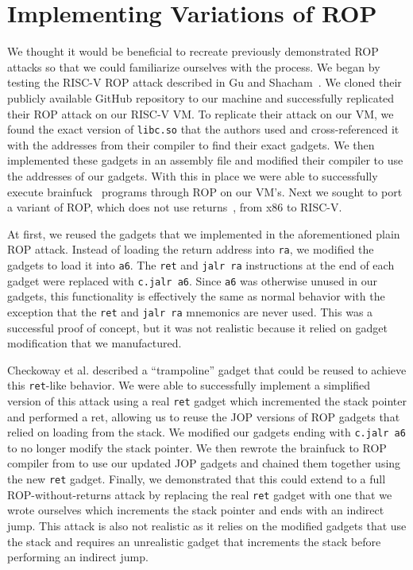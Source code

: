 \section{Implementing Variations of ROP}

We thought it would be beneficial to recreate previously demonstrated ROP attacks
so that we could familiarize ourselves with the process. We began by testing the
RISC-V ROP attack described in Gu and Shacham~\cite{gu20ropriscv}. We cloned
their publicly available GitHub repository to our machine and successfully
replicated their ROP attack on our RISC-V VM. To replicate their attack on our VM, we
found the exact version of \verb|libc.so| that the authors used and cross-referenced
it with the addresses from their compiler to find their exact gadgets. We then
implemented these gadgets in an assembly file and modified their compiler to use
the addresses of our gadgets. With this in place we were able to successfully execute
brainfuck~\cite{gu20ropriscv,brainfuck} programs through ROP on our VM's. Next we sought to port a variant of
ROP, which does not use returns~\cite{checkoway10ropnoret}, from x86 to RISC-V.

At first, we reused the gadgets that we implemented in the aforementioned plain ROP
attack. Instead of loading the return address into \verb|ra|, we modified the
gadgets to load it into \verb|a6|. The \verb|ret| and \verb|jalr ra|
instructions at the end of each gadget were replaced with \verb|c.jalr a6|.
Since \verb|a6| was otherwise unused in our gadgets, this functionality is
effectively the same as normal behavior with the exception that the \verb|ret|
and \verb|jalr ra| mnemonics are never used. This was a successful proof of
concept, but it was not realistic because it relied on gadget modification that
we manufactured.

Checkoway et al. described a ``trampoline'' gadget that could be reused to
achieve this \verb|ret|-like behavior. We were able to successfully implement
a simplified version of this attack using a real \verb|ret| gadget which incremented
the stack pointer and performed a ret, allowing us to reuse the JOP versions of ROP gadgets that
relied on loading from the stack. We modified our gadgets ending with \verb|c.jalr a6|
to no longer modify the stack pointer. We then rewrote the brainfuck to ROP compiler
from \cite{gu20ropriscv} to use our updated JOP gadgets and chained them together
using the new \verb|ret| gadget. Finally, we demonstrated that this could extend to a
full ROP-without-returns attack by replacing the real \verb|ret| gadget with one
that we wrote ourselves which increments the stack pointer and ends with an indirect jump.
This attack is also not realistic as it relies on the modified gadgets that use the stack
and requires an unrealistic gadget that increments the stack before performing an indirect jump.

